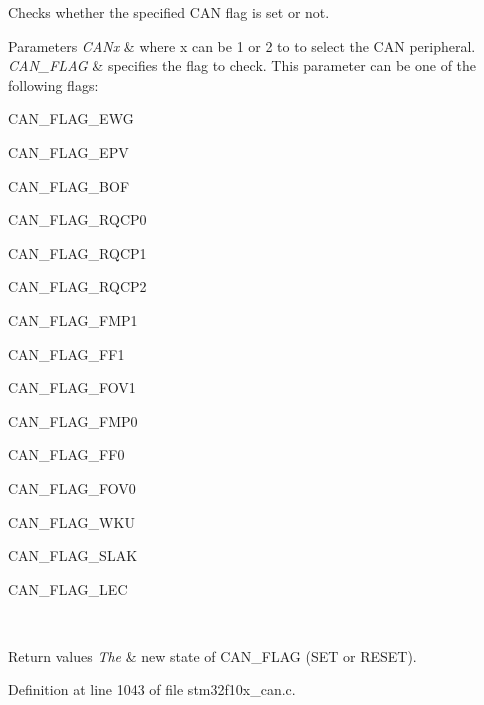 Checks whether the specified C\+AN flag is set or not. 


\begin{DoxyParams}{Parameters}
{\em C\+A\+Nx} & where x can be 1 or 2 to to select the C\+AN peripheral. \\
\hline
{\em C\+A\+N\+\_\+\+F\+L\+AG} & specifies the flag to check. This parameter can be one of the following flags\+:
\begin{DoxyItemize}
\item C\+A\+N\+\_\+\+F\+L\+A\+G\+\_\+\+E\+WG
\item C\+A\+N\+\_\+\+F\+L\+A\+G\+\_\+\+E\+PV
\item C\+A\+N\+\_\+\+F\+L\+A\+G\+\_\+\+B\+OF
\item C\+A\+N\+\_\+\+F\+L\+A\+G\+\_\+\+R\+Q\+C\+P0
\item C\+A\+N\+\_\+\+F\+L\+A\+G\+\_\+\+R\+Q\+C\+P1
\item C\+A\+N\+\_\+\+F\+L\+A\+G\+\_\+\+R\+Q\+C\+P2
\item C\+A\+N\+\_\+\+F\+L\+A\+G\+\_\+\+F\+M\+P1
\item C\+A\+N\+\_\+\+F\+L\+A\+G\+\_\+\+F\+F1
\item C\+A\+N\+\_\+\+F\+L\+A\+G\+\_\+\+F\+O\+V1
\item C\+A\+N\+\_\+\+F\+L\+A\+G\+\_\+\+F\+M\+P0
\item C\+A\+N\+\_\+\+F\+L\+A\+G\+\_\+\+F\+F0
\item C\+A\+N\+\_\+\+F\+L\+A\+G\+\_\+\+F\+O\+V0
\item C\+A\+N\+\_\+\+F\+L\+A\+G\+\_\+\+W\+KU
\item C\+A\+N\+\_\+\+F\+L\+A\+G\+\_\+\+S\+L\+AK
\item C\+A\+N\+\_\+\+F\+L\+A\+G\+\_\+\+L\+EC 
\end{DoxyItemize}\\
\hline
\end{DoxyParams}

\begin{DoxyRetVals}{Return values}
{\em The} & new state of C\+A\+N\+\_\+\+F\+L\+AG (S\+ET or R\+E\+S\+ET). \\
\hline
\end{DoxyRetVals}


Definition at line 1043 of file stm32f10x\+\_\+can.\+c.

